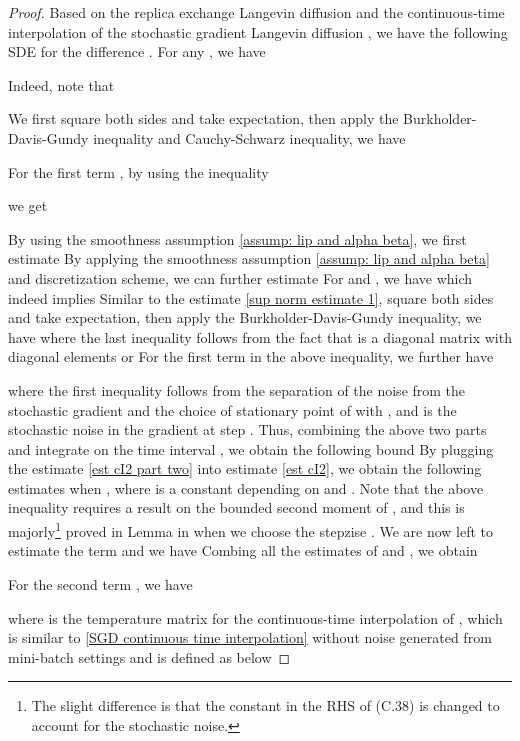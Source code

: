 \begin{proof}
Based on the replica exchange Langevin diffusion  and the continuous-time interpolation of the stochastic gradient Langevin diffusion , we have the following SDE for the difference . For any , we have

Indeed, note that

We first square both sides and take expectation, then apply the Burkholder-Davis-Gundy inequality and  Cauchy-Schwarz inequality, we have 


\noindent

For the first term , by using the inequality
 
we get  

By using the smoothness assumption \ref{assump: lip and alpha beta}, we first estimate 
{}
By applying the smoothness assumption \ref{assump: lip and alpha beta} and discretization scheme, we can further estimate 
{}
For  and , we have
{}
which indeed implies
{}
Similar to the estimate \eqref{sup norm estimate 1}, square both sides and take expectation, then apply the Burkholder-Davis-Gundy inequality, we have
{}
where the last inequality follows from the fact that  is a diagonal matrix with diagonal elements  or 
For the first term in the above inequality, we further have

where the first inequality follows from the separation of the noise from the stochastic gradient and the choice of stationary point  of  with , and  is the stochastic noise in the gradient at step . Thus, combining the above two parts and integrate  on the time interval , we obtain the following bound 
{}
By plugging the estimate \eqref{est cI2 part two} into estimate \eqref{est cI2}, we obtain the following estimates when ,
{}
where  is a constant depending on  and . Note that the above inequality requires a result on the bounded second moment of   , and this is majorly\footnote{The slight difference is that the constant in the RHS of (C.38) \citet{chen2018accelerating} is changed to account for the stochastic noise.} proved in Lemma  in \citet{chen2018accelerating} when we choose the stepzise . We are now left to estimate the term  and we have
{}
Combing all the estimates of  and , we obtain
{}
\noindent

For the second term , we have 

where  is the temperature matrix for the continuous-time interpolation of , which is similar to \eqref{SGD continuous time interpolation} without noise generated from mini-batch settings and is defined as below



\end{proof}
